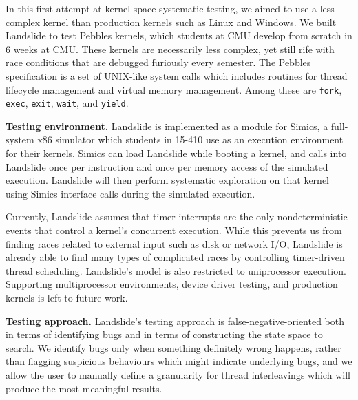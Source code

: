 \documentclass{llncs}
\begin{document}

In this first attempt at kernel-space systematic testing, we aimed to use a less complex kernel than production kernels such as Linux and Windows. We built Landslide to test Pebbles kernels, which students at CMU develop from scratch in 6 weeks at CMU. These kernels are necessarily less complex, yet still rife with race conditions that are debugged furiously every semester.
The Pebbles specification \cite{kspec} is a set of UNIX-like system calls which includes routines for thread lifecycle management and virtual memory management. Among these are \texttt{fork}, \texttt{exec}, \texttt{exit}, \texttt{wait}, and \texttt{yield}.

{\bf Testing environment.} Landslide is implemented as a module for Simics, a full-system x86 simulator which students in 15-410 use as an execution environment for their kernels. Simics can load Landslide while booting a kernel, and calls into Landslide once per instruction and once per memory access of the simulated execution. Landslide will then perform systematic exploration on that kernel using Simics interface calls during the simulated execution.

Currently, Landslide assumes that timer interrupts are the only nondeterministic events that control a kernel's concurrent execution. While this prevents us from finding races related to external input such as disk or network I/O, Landslide is already able to find many types of complicated races by controlling timer-driven thread scheduling.
Landslide's model is also restricted to uniprocessor execution. Supporting multiprocessor environments, device driver testing, and production kernels is left to future work.


{\bf Testing approach.} Landslide's testing approach is false-negative-oriented both in terms of identifying bugs and in terms of constructing the state space to search. 
We identify bugs only when something definitely wrong happens, rather than flagging suspicious behaviours which might indicate underlying bugs, and we allow the user to manually define a granularity for thread interleavings which will produce the most meaningful results.
\end{document}
